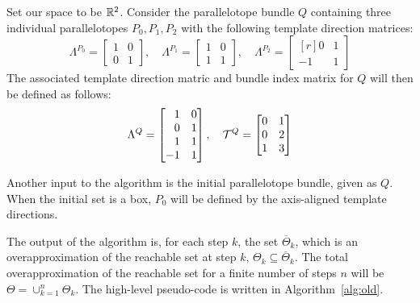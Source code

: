 \begin{example}
Set our space to be ${\mathbb{R}}^2$. Consider the parallelotope bundle $Q$ containing three individual parallelotopes $P_0, P_1, P_2$ with the following template direction matrices:
  \begin{equation*}
    \Lambda^{P_0}  = \begin{bmatrix}
                  1 & 0 \\
                  0 & 1
                  \end{bmatrix}, \quad
    \Lambda^{P_1}  = \begin{bmatrix}
                    1 & 0 \\
                    1 & 1
                    \end{bmatrix}, \quad
    \Lambda^{P_2} = \begin{bmatrix*}[r]
                    0 & 1 \\
                   -1 & 1
                    \end{bmatrix*}
  \end{equation*}
  The associated template direction matric and bundle index matrix for $Q$ will then be defined as follows:
  \begin{equation*}
    \Lambda^{Q} = \begin{bmatrix*}[r]
                  1 & 0 \\
                  0 & 1 \\
                  1 & 1 \\
                  -1 & 1
                  \end{bmatrix*}, \quad
                  \T^Q = \begin{bmatrix}
                          0 & 1 \\
                          0 & 2 \\
                          1 & 3
                         \end{bmatrix}
  \end{equation*}
\end{example}

Another input to the algorithm is the initial parallelotope bundle, given as $Q$. When the initial set is a box, $P_0$ will be defined by the axis-aligned template directions.

The output of the algorithm is, for each step $k$, the set $\overline\Theta_k$, which is an overapproximation of the reachable set at step $k$, $\Theta_k \subseteq \overline\Theta_k$. The total overapproximation of the reachable set for a finite number of steps $n$ will be $\Theta = \cup_{k=1}^n \Theta_k$.
%
The high-level pseudo-code is written in Algorithm~\ref{alg:old}.

